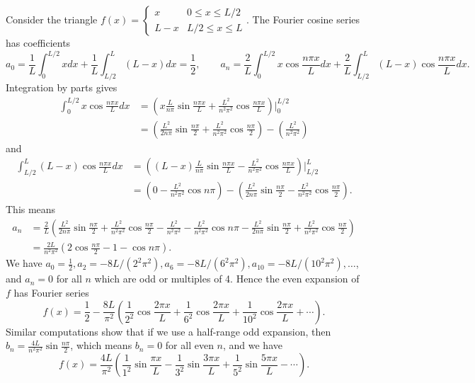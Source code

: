 {Consider the triangle $f(x) = \begin{cases}x&0\leq x\leq L/2\\L-x&L/2\leq x\leq L\end{cases}$. The Fourier cosine series has coefficients 
$$a_0=\frac{1}{L}\int_0^{L/2} x dx+\frac{1}{L}\int_{L/2}^L (L-x) dx = \frac{1}{2},\quad\quad a_n=\frac{2}{L}\int_0^{L/2} x\cos \frac{n\pi x}{L}dx + \frac{2}{L}\int_{L/2}^L (L-x)\cos \frac{n\pi x}{L}dx.$$
Integration by parts gives 
\begin{align*}
\int_0^{L/2} x\cos \frac{n\pi x}{L}dx 
&= \left(x\frac{L}{n\pi}\sin\frac{n\pi x}{L} + \frac{L^2}{n^2\pi^2}\cos\frac{n\pi x}{L}\right)\bigg|_{0}^{L/2} \\
&= \left(\frac{L^2}{2n\pi}\sin\frac{n\pi }{2} + \frac{L^2}{n^2\pi^2}\cos\frac{n\pi }{2}\right) - \left(\frac{L^2}{n^2\pi^2}\right)
\end{align*}
and
\begin{align*}
\int_{L/2}^L (L-x)\cos \frac{n\pi x}{L}dx 
&= \left((L-x)\frac{L}{n\pi}\sin\frac{n\pi x}{L} - \frac{L^2}{n^2\pi^2}\cos\frac{n\pi x}{L}\right)\bigg|_{L/2}^L \\
&= \left( 0-\frac{L^2}{n^2\pi^2}\cos n\pi \right) 
- \left(\frac{L^2}{2n\pi}\sin\frac{n\pi}{2} - \frac{L^2}{n^2\pi^2}\cos\frac{n\pi }{2}\right).
\end{align*}
This means 
\begin{align*}
a_n 
&= \frac{2}{L}\left(\frac{L^2}{2n\pi}\sin\frac{n\pi }{2} + \frac{L^2}{n^2\pi^2}\cos\frac{n\pi }{2} - \frac{L^2}{n^2\pi^2} -\frac{L^2}{n^2\pi^2}\cos n\pi  
- \frac{L^2}{2n\pi}\sin\frac{n\pi }{2} + \frac{L^2}{n^2\pi^2}\cos\frac{n\pi }{2}\right) \\
&= \frac{2L}{n^2\pi^2}\left(2\cos\frac{n\pi }{2} -1 - \cos n\pi \right).
\end{align*}
We have $a_0=\frac{1}{2}, a_2=-8L/(2^2\pi^2), a_6= -8L/(6^2\pi^2), a_{10}=-8L/(10^2\pi^2) ,\ldots$, and $a_n=0$ for all $n$ which are odd or multiples of 4.   Hence the even expansion of $f$ has Fourier series 
$$f(x) = \frac{1}{2} -\frac{8L}{\pi^2}\left( \frac{1}{2^2}\cos \frac{2\pi x}{L} +  \frac{1}{6^2}\cos \frac{2\pi x}{L}+  \frac{1}{10^2}\cos \frac{2\pi x}{L}+\cdots\right).$$
Similar computations show that if we use a half-range odd expansion, then $b_n = \frac{4L}{n^2\pi^2}\sin\frac{n\pi}{2}$, which means $b_n = 0$ for all even $n$, and we have 
$$f(x) = \frac{4L}{\pi^2}\left( \frac{1}{1^2}\sin \frac{\pi x}{L} -  \frac{1}{3^2}\sin \frac{3\pi x}{L}+  \frac{1}{5^2}\sin \frac{5\pi x}{L}-\cdots\right).$$

}
